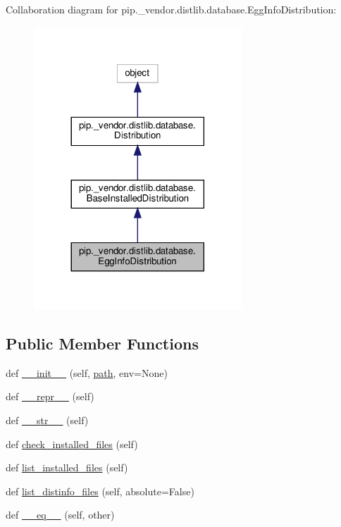 Collaboration diagram for pip.\+\_\+vendor.\+distlib.\+database.\+Egg\+Info\+Distribution\+:
\nopagebreak
\begin{figure}[H]
\begin{center}
\leavevmode
\includegraphics[width=221pt]{classpip_1_1__vendor_1_1distlib_1_1database_1_1EggInfoDistribution__coll__graph}
\end{center}
\end{figure}
\subsection*{Public Member Functions}
\begin{DoxyCompactItemize}
\item 
def \hyperlink{classpip_1_1__vendor_1_1distlib_1_1database_1_1EggInfoDistribution_a3b17587547b5d4fb68128342686671b1}{\+\_\+\+\_\+init\+\_\+\+\_\+} (self, \hyperlink{classpip_1_1__vendor_1_1distlib_1_1database_1_1EggInfoDistribution_ab072a8f377ba687962b592a5e3d3b25c}{path}, env=None)
\item 
def \hyperlink{classpip_1_1__vendor_1_1distlib_1_1database_1_1EggInfoDistribution_aa86b5634260c5ab9efe7b3dd01b3c7e5}{\+\_\+\+\_\+repr\+\_\+\+\_\+} (self)
\item 
def \hyperlink{classpip_1_1__vendor_1_1distlib_1_1database_1_1EggInfoDistribution_ad62e8373038a195c6bfd78f6d917f1a9}{\+\_\+\+\_\+str\+\_\+\+\_\+} (self)
\item 
def \hyperlink{classpip_1_1__vendor_1_1distlib_1_1database_1_1EggInfoDistribution_a4eb9053abcb6ae611e7f31c17387aea7}{check\+\_\+installed\+\_\+files} (self)
\item 
def \hyperlink{classpip_1_1__vendor_1_1distlib_1_1database_1_1EggInfoDistribution_ad11f1a01b3d7117ca45670f4de85b97c}{list\+\_\+installed\+\_\+files} (self)
\item 
def \hyperlink{classpip_1_1__vendor_1_1distlib_1_1database_1_1EggInfoDistribution_a81eb42fe04552504c3c44bae820de34b}{list\+\_\+distinfo\+\_\+files} (self, absolute=False)
\item 
def \hyperlink{classpip_1_1__vendor_1_1distlib_1_1database_1_1EggInfoDistribution_a1a4e220bb20d7de097cb45e4d22cb1f7}{\+\_\+\+\_\+eq\+\_\+\+\_\+} (self, other)
\end{DoxyCompactItemize}
